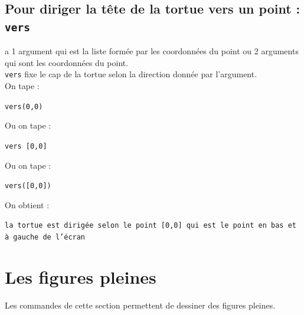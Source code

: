 \documentclass[a4paper,11pt]{book}
\begin{document}
\subsection{Pour diriger la t\^ete de la tortue vers un point : {\tt vers}}
 a 1 argument qui est la liste form\'ee par les 
coordonn\'ees du point ou 2 arguments qui sont les coordonn\'ees du point.\\
{\tt vers} fixe le cap de la tortue selon la direction donn\'ee par 
l'argument.\\
On tape :
\begin{center}{\tt vers(0,0)}\end{center}
Ou on tape :
\begin{center}{\tt vers [0,0]}\end{center}
Ou on tape :
\begin{center}{\tt vers([0,0])}\end{center}
On obtient :
\begin{center}{\tt la tortue est dirig\'ee selon le point [0,0] qui est le point en bas et \`a gauche de l'\'ecran}\end{center}
\section{Les figures pleines}
Les commandes de cette section permettent de dessiner des figures pleines.
\end{document}
